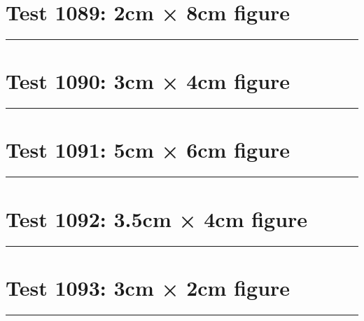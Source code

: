 \documentclass[a4paper,11pt]{article}
\begin{document}
\section*{Test 1089: 2cm × 8cm figure}
\begin{swarmwrap}%
  \begin{minipage}[t]{2cm}
    \centering
    \rule{\linewidth}{8cm}
  \end{minipage}%
\end{swarmwrap}%
\swarmwrapnext
\lipsum[144]
\lipsum[145]
\lipsum[146]
\lipsum[147]
\lipsum[148]
\section*{Test 1090: 3cm × 4cm figure}
\begin{swarmwrap}%
  \begin{minipage}[t]{3cm}
    \centering
    \rule{\linewidth}{4cm}
  \end{minipage}%
\end{swarmwrap}%
\swarmwrapnext
\lipsum[1]
\lipsum[2]
\lipsum[3]
\lipsum[4]
\section*{Test 1091: 5cm × 6cm figure}
\begin{swarmwrap}%
  \begin{minipage}[t]{5cm}
    \centering
    \rule{\linewidth}{6cm}
  \end{minipage}%
\end{swarmwrap}%
\swarmwrapnext
\lipsum[86]
\lipsum[87]
\lipsum[88]
\section*{Test 1092: 3.5cm × 4cm figure}
\begin{swarmwrap}%
  \begin{minipage}[t]{3cm}
    \centering
    \rule{\linewidth}{4cm}
  \end{minipage}%
\end{swarmwrap}%
\swarmwrapnext
\lipsum[41]
\lipsum[42]
\lipsum[43]
\section*{Test 1093: 3cm × 2cm figure}
\begin{swarmwrap}%
  \begin{minipage}[t]{3cm}
    \centering
    \rule{\linewidth}{2cm}
  \end{minipage}%
\end{swarmwrap}%
\swarmwrapnext
\lipsum[127]
\lipsum[128]
\lipsum[129]
\lipsum[130]
\lipsum[131]
\end{document}
